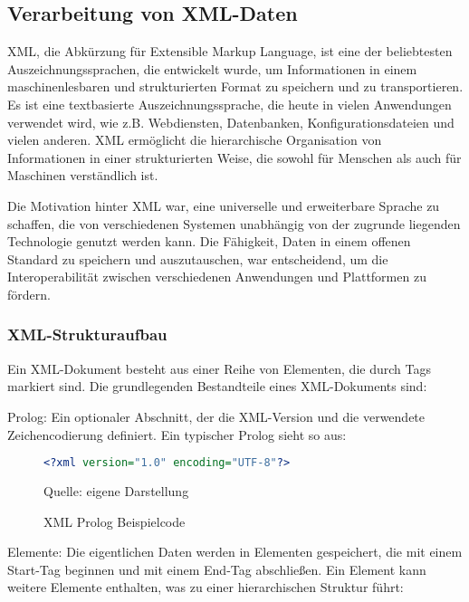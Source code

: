 \subsection{Verarbeitung von XML-Daten}
\label{subsec:verarbeitung-von-xml-daten}

XML, die Abkürzung für Extensible Markup Language, ist eine der beliebtesten Auszeichnungssprachen, die entwickelt wurde,
um Informationen in einem maschinenlesbaren und strukturierten Format zu speichern und zu transportieren.
Es ist eine textbasierte Auszeichnungssprache, die heute in vielen Anwendungen verwendet wird, wie z.B. Webdiensten,
Datenbanken, Konfigurationsdateien und vielen anderen.
XML ermöglicht die hierarchische Organisation von Informationen in einer strukturierten Weise, die sowohl für Menschen
als auch für Maschinen verständlich ist.

Die Motivation hinter XML war, eine universelle und erweiterbare Sprache zu schaffen, die von verschiedenen Systemen
unabhängig von der zugrunde liegenden Technologie genutzt werden kann.
Die Fähigkeit, Daten in einem offenen Standard zu speichern und auszutauschen, war entscheidend,
um die Interoperabilität zwischen verschiedenen Anwendungen und Plattformen zu fördern.

\subsubsection{XML-Strukturaufbau}

Ein XML-Dokument besteht aus einer Reihe von Elementen, die durch Tags markiert sind.
Die grundlegenden Bestandteile eines XML-Dokuments sind:

Prolog: Ein optionaler Abschnitt, der die XML-Version und die verwendete Zeichencodierung definiert.
Ein typischer Prolog sieht so aus:

\begin{figure}[H]
\centering
\begin{minipage}{0.95\textwidth}
\begin{lstlisting}[language=XML]
<?xml version="1.0" encoding="UTF-8"?>
\end{lstlisting}
\end{minipage}
\caption{XML Prolog Beispielcode}
\label{fig:XML Prolog Beispielcode}
    {Quelle: eigene Darstellung}
\end{figure}

Elemente: Die eigentlichen Daten werden in Elementen gespeichert, die mit einem Start-Tag beginnen und mit einem End-Tag abschließen.
Ein Element kann weitere Elemente enthalten, was zu einer hierarchischen Struktur führt:


